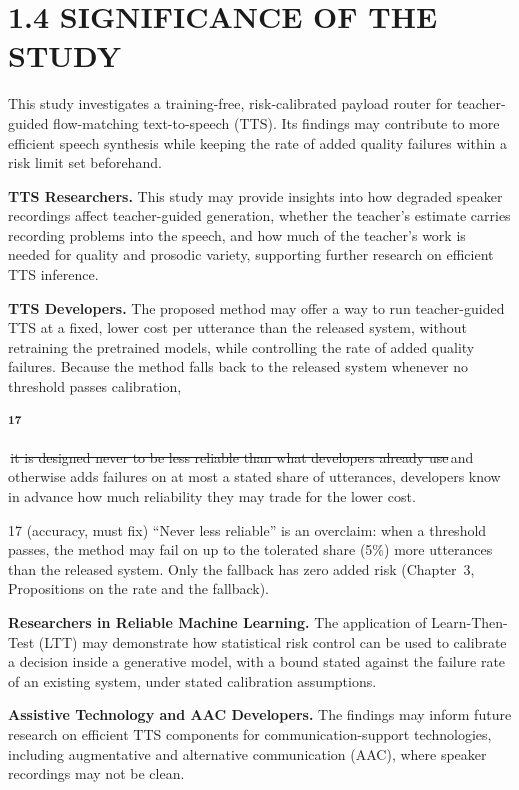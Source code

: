 \documentclass[11pt,a4paper]{article}
\newcommand{\chg}[2]{{\color{delcol}\sout{#1}}\,{\color{addcol}#2}}
\newcommand{\flag}[2]{\colorbox{flagcol}{\strut\textsuperscript{\bfseries #1}}\,{#2}}
\newcounter{cmt}
\begin{document}
\section*{1.4 SIGNIFICANCE OF THE STUDY}
This study investigates a training-free, risk-calibrated payload router for teacher-guided flow-matching text-to-speech (TTS). Its findings may contribute to more efficient speech synthesis while keeping the rate of added quality failures within a risk limit set beforehand.

\textbf{TTS Researchers.} This study may provide insights into how degraded speaker recordings affect teacher-guided generation, whether the teacher's estimate carries recording problems into the speech, and how much of the teacher's work is needed for quality and prosodic variety, supporting further research on efficient TTS inference.

\textbf{TTS Developers.} The proposed method may offer a way to run teacher-guided TTS at a fixed, lower cost per utterance than the released system, without retraining the pretrained models, while controlling the rate of added quality failures. Because the method falls back to the released system whenever no threshold passes calibration, \flag{17}{\chg{it is designed never to be less reliable than what developers already use}{and otherwise adds failures on at most a stated share of utterances, developers know in advance how much reliability they may trade for the lower cost}}.

\begin{cmt}{17 (accuracy, must fix)}
``Never less reliable'' is an overclaim: when a threshold passes, the method may fail on up to the tolerated share (5\%) more utterances than the released system. Only the fallback has zero added risk (Chapter~3, Propositions on the rate and the fallback).
\end{cmt}

\textbf{Researchers in Reliable Machine Learning.} The application of Learn-Then-Test (LTT) may demonstrate how statistical risk control can be used to calibrate a decision inside a generative model, with a bound stated against the failure rate of an existing system, under stated calibration assumptions.

\textbf{Assistive Technology and AAC Developers.} The findings may inform future research on efficient TTS components for communication-support technologies, including augmentative and alternative communication (AAC), where speaker recordings may not be clean.
\end{document}
